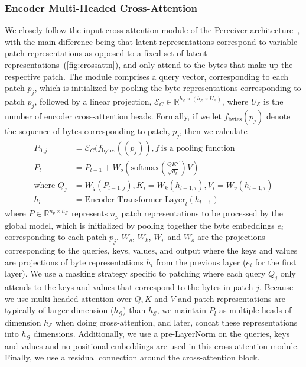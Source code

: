 \documentclass[]{fairmeta}
\begin{document}
\subsubsection{Encoder Multi-Headed Cross-Attention}
\label{sec:enc-cross-attn}
We closely follow the input cross-attention module of the Perceiver architecture~\citep{jaegle2021perceiver}, with the main difference being that latent representations correspond to variable patch representations as opposed to a fixed set of latent representations~(\autoref{fig:crossattn}), and only attend to the bytes that make up the respective patch.
The module comprises a query vector, corresponding to each patch $p_j$, which is initialized by pooling the byte representations corresponding to patch $p_j$, followed by a linear projection, $\mathcal{E}_{C} \in \mathbb{R}^{h_{\mathcal{E}} \times (h_{\mathcal{E}} \times U_{\mathcal{E}})}$, where $U_{\mathcal{E}}$ is the number of encoder cross-attention heads.
Formally, if we let $f_{\text{bytes}}(p_j)$ denote the sequence of bytes corresponding to patch, $p_j$, then we calculate
\begin{align}
P_{0,j} &= \mathcal{E}_{C}(f_\text{bytes}((p_j)), f~ \text{is a pooling function} \\
P_l &= P_{l-1} + W_o\left(\text{softmax}\left(\frac{QK^T}{\sqrt{d_k}}\right)V\right) \\
\text{where } Q_j &= W_q(P_{l-1,j}), K_i = W_k(h_{l-1,i}), V_i = W_v(h_{l-1,i}) \\
h_l &= \text{Encoder-Transformer-Layer}_l(h_{l-1})
\end{align}
where $P \in \mathbb{R}^{n_p \times h_{\mathcal{G}}}$ represents $n_p$ patch representations to be processed by the global model, which is initialized by pooling together the byte embeddings $e_i$ corresponding to each patch $p_j$.
$W_q$, $W_k$, $W_v$ and $W_o$ are the projections corresponding to the queries, keys, values, and output where the keys and values are projections of byte representations $h_i$ from the previous layer ($e_i$ for the first layer).
We use a masking strategy specific to patching where each query $Q_j$ only attends to the keys and values that correspond to the bytes in patch $j$. Because we use multi-headed attention over $Q, K$ and $V$ and patch representations are typically of larger dimension ($h_{\mathcal{G}}$) than $h_{\mathcal{E}}$, we maintain $P_l$ as multiple heads of dimension $h_{\mathcal{E}}$ when doing cross-attention, and later, concat these representations into $h_{\mathcal{G}}$ dimensions.
Additionally, we use a pre-LayerNorm on the queries, keys and values and no positional embeddings are used in this cross-attention module.
Finally, we use a residual connection around the cross-attention block. 
\end{document}
